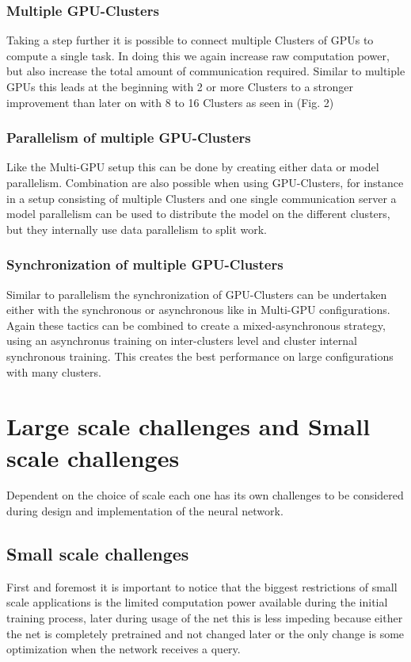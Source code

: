 \documentclass[conference]{IEEEtran}
\begin{document}
\subsubsection{Multiple GPU-Clusters}
Taking a step further it is possible to connect multiple Clusters of GPUs to compute a single task. In doing this we again increase raw computation power, but also increase the total amount of communication required. Similar to multiple GPUs this leads at the beginning with 2 or more Clusters to a stronger improvement than later on with 8 to 16 Clusters as seen in (Fig. 2)

\subsubsection{Parallelism of multiple GPU-Clusters}
Like the Multi-GPU setup this can be done by creating either data or model parallelism. Combination are also possible when using GPU-Clusters, for instance in a setup consisting of multiple Clusters and one single communication server a model parallelism can be used to distribute the model on the different clusters, but they internally use data parallelism to split work\cite{wang2016deep}.

\subsubsection{Synchronization of multiple GPU-Clusters}
Similar to parallelism the synchronization of GPU-Clusters can be undertaken either with the synchronous or asynchronous like in Multi-GPU configurations. Again these tactics can be combined to create a mixed-asynchronous strategy, using an asynchronus training on inter-clusters level and cluster internal synchronous training\cite{sastre2017scalability}. This creates the best performance on large configurations with many clusters\cite{wang2016deep}.



\section{Large scale challenges and Small scale challenges}
Dependent on the choice of scale each one has its own challenges to be considered during design and implementation of the neural network.

\subsection{Small scale challenges}
First and foremost it is important to notice that the biggest restrictions of small scale applications is the limited computation power available during the initial training process, later during usage of the net this is less impeding because either the net is completely pretrained and not changed later or the only change is some optimization when the network receives a query.
\end{document}
